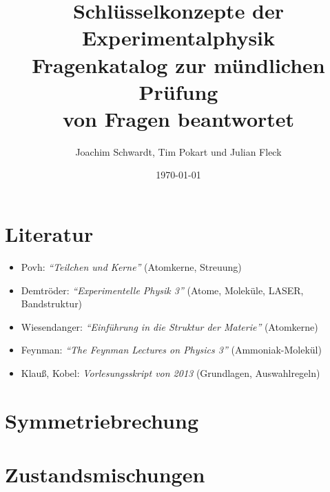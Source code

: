 \documentclass[]{scrartcl}
\title{Schlüsselkonzepte der Experimentalphysik\\Fragenkatalog zur mündlichen Prüfung\\\vspace{.4em}\small{
\total{questionsansweredtotal} von \total{questionstotal} Fragen beantwortet}}
\author{Joachim Schwardt, Tim Pokart und Julian Fleck }
\date{\today}
\newcounter{question}
\numberwithin{question}{section}
\numberwithin{figure}{section}
\numberwithin{table}{section}
\begin{document}
\maketitle
\tableofcontents

\clearpage
{}
{}
\listofquestions

\cleardoublepage
\section*{Literatur}
\label{sec:literatur}

\begin{itemize}
    \item Povh: \textit{``Teilchen und Kerne''} (Atomkerne, Streuung)
    \item Demtröder: \textit{``Experimentelle Physik 3''} (Atome, Moleküle, LASER, Bandstruktur)
    \item Wiesendanger: \textit{``Einführung in die Struktur der Materie''} (Atomkerne)
    \item Feynman: \textit{``The Feynman Lectures on Physics 3''} (Ammoniak-Molekül)
    \item Klauß, Kobel: \textit{Vorlesungsskript von  2013} (Grundlagen, Auswahlregeln)
\end{itemize}

\cleardoublepage
\section{Symmetriebrechung}


\cleardoublepage
\section{Zustandsmischungen}


% 
\end{document}
